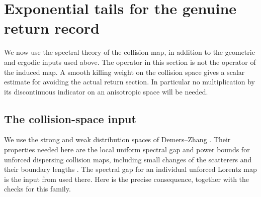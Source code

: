 \section{Exponential tails for the genuine return record}
\label{sec:exponential-returns}
We now use the spectral theory of the collision map, in addition to the
geometric and ergodic inputs used above. The operator in this section is
not the operator of the induced map. A smooth killing weight on the
collision space gives a scalar estimate for avoiding the actual return
section. In particular no multiplication by its discontinuous indicator
on an anisotropic space will be needed.

\subsection{The collision-space input}
We use the strong and weak distribution spaces of Demers--Zhang
\cite[Section 3.3]{DZ}. Their properties needed here are the local uniform
spectral gap and power bounds for unforced dispersing collision maps,
including small changes of the scatterers and their boundary lengths
\cite[Theorems 2.1--2.6 and Remark 2.7(b)]{DZ}. The spectral gap for an
individual unforced Lorentz map is the input from \cite{DZ11} used there.
Here is the precise consequence, together with the checks for this family.

